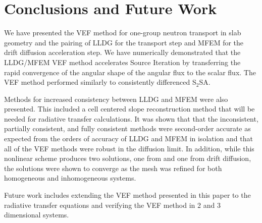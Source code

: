 
\section{Conclusions and Future Work}
We have presented the VEF method for one-group neutron transport in slab geometry and the pairing of LLDG for the \SN transport step and MFEM for the drift diffusion acceleration step. We have numerically demonstrated that the LLDG/MFEM VEF method accelerates Source Iteration by transferring the rapid convergence of the angular shape of the angular flux to the scalar flux. The VEF method performed similarly to consistently differenced S$_2$SA. 

Methods for increased consistency between LLDG and MFEM were also presented. This included a cell centered slope reconstruction method that will be needed for radiative transfer calculations. It was shown that that the inconsistent, partially consistent, and fully consistent methods were second-order accurate as expected from the orders of accuracy of LLDG and MFEM in isolation and that all of the VEF methods were robust in the diffusion limit. In addition, while this nonlinear scheme produces two solutions, one from \SN and one from drift diffusion, the solutions were shown to converge as the mesh was refined for both homogeneous and inhomogeneous systems. 


Future work includes extending the VEF method presented in this paper to the radiative transfer equations and verifying the VEF method in 2 and 3 dimensional systems. 